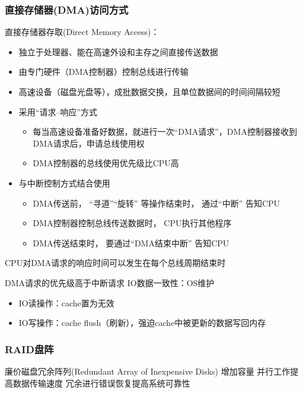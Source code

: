 \subsubsection{直接存储器(DMA)访问方式}
直接存储器存取(Direct Memory Access)：
\begin{itemize}
	\item 独立于处理器、能在高速外设和主存之间直接传送数据
	\item 由专门硬件（DMA控制器）控制总线进行传输
	\item 高速设备（磁盘光盘等），成批数据交换，且单位数据间的时间间隔较短
\end{itemize}
\begin{itemize}
\item 采用“请求--响应”方式
\begin{itemize}
	\item 每当高速设备准备好数据，就进行一次“DMA请求”，DMA控制器接收到DMA请求后，申请总线使用权
	\item DMA控制器的总线使用优先级比CPU高
\end{itemize}
\item 与中断控制方式结合使用
\begin{itemize}
	\item DMA传送前， “寻道”“旋转” 等操作结束时， 通过“中断” 告知CPU
	\item DMA控制器控制总线传送数据时， CPU执行其他程序
	\item DMA传送结束时， 要通过“DMA结束中断” 告知CPU
\end{itemize}
\end{itemize}
\par CPU对DMA请求的响应时间可以发生在每个总线周期结束时
\par DMA请求的优先级高于中断请求
IO数据一致性：OS维护
\begin{itemize}
	\item IO读操作：cache置为无效
	\item IO写操作：cache flush（刷新），强迫cache中被更新的数据写回内存
\end{itemize}

\subsubsection{RAID盘阵}
廉价磁盘冗余阵列(Redundant Array of Inexpensive Disks)
增加容量
并行工作提高数据传输速度
冗余进行错误恢复提高系统可靠性